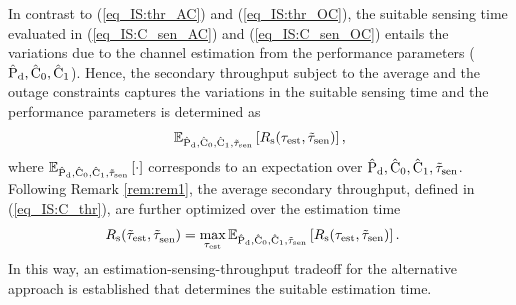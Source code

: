 \begin{coro} \label{cor:cor1}
\normalfont
{} 
In contrast to (\ref{eq_IS:thr_AC}) and (\ref{eq_IS:thr_OC}), the suitable sensing time evaluated in (\ref{eq_IS:C_sen_AC}) and (\ref{eq_IS:C_sen_OC}) entails the variations due to the channel estimation from the performance parameters ($\epd, \ecz, \eco$). Hence, the secondary throughput subject to the average and the outage constraints captures the variations in the suitable sensing time and the performance parameters is determined as 
\begin{align}
\e{\epd, \ecz, \eco, \ttsen}{\rs(\test, \ttsen)} \label{eq_IS:C_thr},
\end{align}
where $\e{\epd, \ecz, \eco, \ttsen}{\cdot}$ corresponds to an expectation over $\epd, \ecz, \eco, \ttsen$.
Following Remark \ref{rem:rem1}, the average secondary throughput, defined in (\ref{eq_IS:C_thr}), are further optimized over the estimation time 
\begin{align}
\trs(\ttest, \ttsenac) &= \maxi_{\test} \e{\epd, \ecz, \eco, \ttsen}{\rs(\test, \ttsen)} \label{eq_IS:C_thr_AC}. 
\end{align}
In this way, an estimation-sensing-throughput tradeoff for the alternative approach is established that determines the suitable estimation time.    
\end{coro}
